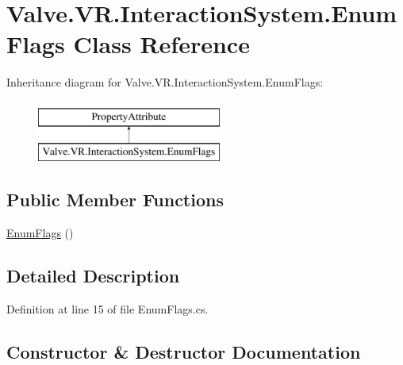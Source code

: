 \hypertarget{class_valve_1_1_v_r_1_1_interaction_system_1_1_enum_flags}{}\section{Valve.\+V\+R.\+Interaction\+System.\+Enum\+Flags Class Reference}
\label{class_valve_1_1_v_r_1_1_interaction_system_1_1_enum_flags}
Inheritance diagram for Valve.\+V\+R.\+Interaction\+System.\+Enum\+Flags\+:\begin{figure}[H]
\begin{center}
\leavevmode
\includegraphics[height=2.000000cm]{class_valve_1_1_v_r_1_1_interaction_system_1_1_enum_flags}
\end{center}
\end{figure}
\subsection*{Public Member Functions}
\begin{DoxyCompactItemize}
\item 
\mbox{\hyperlink{class_valve_1_1_v_r_1_1_interaction_system_1_1_enum_flags_a1684d6e0aeb19bc4718d842c5c22b17e}{Enum\+Flags}} ()
\end{DoxyCompactItemize}


\subsection{Detailed Description}


Definition at line 15 of file Enum\+Flags.\+cs.



\subsection{Constructor \& Destructor Documentation}
\mbox{\label{class_valve_1_1_v_r_1_1_interaction_system_1_1_enum_flags_a1684d6e0aeb19bc4718d842c5c22b17e}} 
